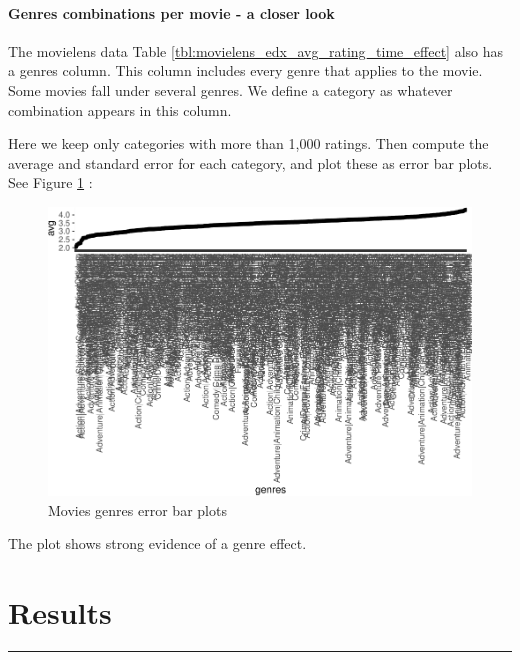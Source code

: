 \documentclass[
]{article}
\begin{document}
\newpage

\hypertarget{genres-combinations-per-movie---a-closer-look}{%
\paragraph{Genres combinations per movie - a closer
look}\label{genres-combinations-per-movie---a-closer-look}}

The movielens data Table \ref{tbl:movielens_edx_avg_rating_time_effect}
also has a genres column. This column includes every genre that applies
to the movie. Some movies fall under several genres. We define a
category as whatever combination appears in this column.

Here we keep only categories with more than 1,000 ratings. Then compute
the average and standard error for each category, and plot these as
error bar plots. See Figure \ref{fig:genres_error_bar_plots} :

\begin{figure}
\centering
\includegraphics{figures/gnr-1.pdf}
\caption{Movies genres error bar
plots\label{fig:genres_error_bar_plots}}
\end{figure}

The plot shows strong evidence of a genre effect.

\newpage

\hypertarget{results}{%
\section{Results}\label{results}}

\begin{center}\rule{0.5\linewidth}{0.5pt}\end{center}
\end{document}
